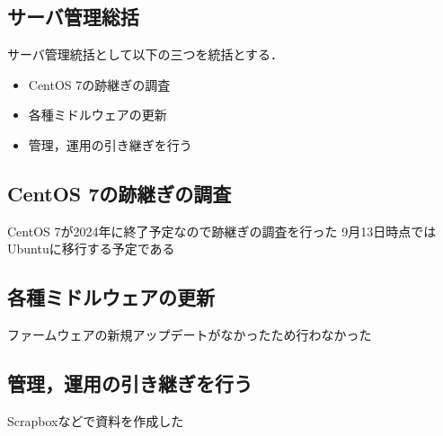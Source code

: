 \subsection*{サーバ管理総括}


サーバ管理統括として以下の三つを統括とする．
\begin{itemize}
    \item CentOS 7の跡継ぎの調査
    \item 各種ミドルウェアの更新
    \item 管理，運用の引き継ぎを行う
\end{itemize}

\subsection*{CentOS 7の跡継ぎの調査}
CentOS 7が2024年に終了予定なので跡継ぎの調査を行った
9月13日時点ではUbuntuに移行する予定である

\subsection*{各種ミドルウェアの更新}
ファームウェアの新規アップデートがなかったため行わなかった

\subsection*{管理，運用の引き継ぎを行う}
Scrapboxなどで資料を作成した